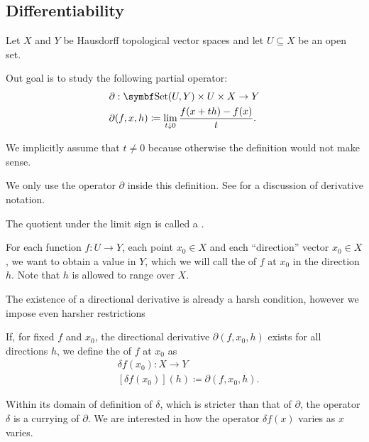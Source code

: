 \subsection{Differentiability}\label{subsec:differentiability}

Let \( X \) and \( Y \) be Hausdorff topological vector spaces and let \( U \subseteq X \) be an open set.

\begin{definition}\label{def:differentiability}
  Out goal is to study the following partial operator:
  \begin{align}\label{def:differentiability/partial_operator}
    &\partial: \Cat{Set}(U, Y) \times U \times X \to Y \\
    &\partial(f, x, h) \coloneqq \lim_{t \downarrow 0} \frac {f(x + th) - f(x)} t.
  \end{align}

  We implicitly assume that \( t \neq 0 \) because otherwise the definition would not make sense.

  We only use the operator \( \partial \) inside this definition. See  for a discussion of derivative notation.

  The quotient under the limit sign is called a .

  For each function \( f: U \to Y \), each point \( x_0 \in X \) and each \enquote{direction} vector \( x_0 \in X \), we want to obtain a value in \( Y \), which we will call the  of \( f \) at \( x_0 \) in the direction \( h \). Note that \( h \) is allowed to range over \( X \).

  The existence of a directional derivative is already a harsh condition, however we impose even harsher restrictions

  \begin{defenum}
    \cite[section 0.2.1]{Йоффе1974} If, for fixed \( f \) and \( x_0 \), the directional derivative \( \partial(f, x_0, h) \) exists for all directions \( h \), we define the  of \( f \) at \( x_0 \) as
    \begin{align*}
      &\delta f(x_0): X \to Y \\
      &[\delta f(x_0)](h) \coloneqq \partial(f, x_0, h).
    \end{align*}

    Within its domain of definition of \( \delta \), which is stricter than that of \( \partial \), the operator \( \delta \) is a currying of \( \partial \). We are interested in how the operator \( \delta f(x) \) varies as \( x \) varies.


\end{defenum}
\end{definition}
